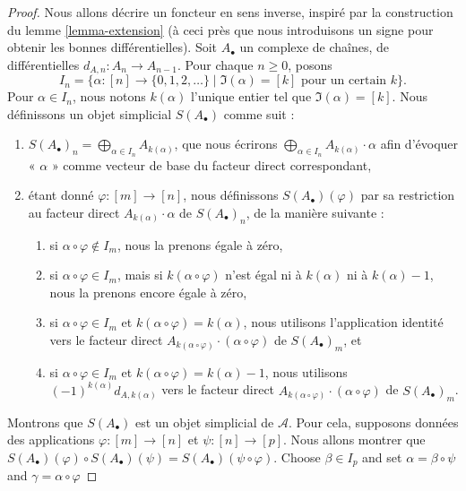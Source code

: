 \begin{proof}
Nous allons décrire un foncteur en sens inverse,
inspiré par la construction du lemme \ref{lemma-extension}
(à ceci près que nous introduisons un signe pour obtenir les bonnes
différentielles). Soit $A_\bullet$ un complexe de chaînes, de différentielles
$d_{A, n} : A_n \to A_{n - 1}$. Pour chaque $n \geq 0$, posons
$$
I_n =
\Big\{
\alpha : [n] \to \{0, 1, 2, \ldots\}
\mid
\Im(\alpha) = [k]\text{ pour un certain }k
\Big\}.
$$
Pour $\alpha \in I_n$, nous notons $k(\alpha)$ l'unique
entier tel que $\Im(\alpha) = [k]$.
Nous définissons un objet simplicial $S(A_\bullet)$ comme suit :
\begin{enumerate}
\item $S(A_\bullet)_n = \bigoplus_{\alpha \in I_n} A_{k(\alpha)}$, que
nous écrirons
$\bigoplus_{\alpha \in I_n} A_{k(\alpha)} \cdot \alpha$
afin d'évoquer « $\alpha$ » comme vecteur de base du
facteur direct correspondant,
\item étant donné $\varphi : [m] \to [n]$, nous définissons
$S(A_\bullet)(\varphi)$ par sa restriction au
facteur direct $A_{k(\alpha)} \cdot \alpha$
de $S(A_\bullet)_n$, de la manière suivante :
\begin{enumerate}
\item si $\alpha \circ \varphi \not \in I_m$, nous la prenons égale à zéro,
\item si $\alpha \circ \varphi \in I_m$, mais si $k(\alpha \circ \varphi)$
n'est égal ni à $k(\alpha)$ ni à $k(\alpha) - 1$, nous la prenons
encore égale à zéro,
\item si $\alpha \circ \varphi \in I_m$
et $k(\alpha \circ \varphi) = k(\alpha)$, nous utilisons
l'application identité vers le facteur direct
$A_{k(\alpha \circ \varphi)} \cdot (\alpha \circ \varphi)$
de $S(A_\bullet)_m$, et
\item si $\alpha \circ \varphi \in I_m$
et $k(\alpha \circ \varphi) = k(\alpha) - 1$,
nous utilisons $(-1)^{k(\alpha)} d_{A, k(\alpha)}$ vers le facteur direct
$A_{k(\alpha \circ \varphi)}\cdot (\alpha \circ \varphi)$
de $S(A_\bullet)_m$.
\end{enumerate}
\end{enumerate}
Montrons que $S(A_\bullet)$ est un objet simplicial de $\mathcal{A}$.
Pour cela, supposons données des applications $\varphi : [m] \to [n]$ et
$\psi : [n] \to [p]$. Nous allons montrer que
$S(A_\bullet)(\varphi) \circ S(A_\bullet)(\psi) =
S(A_\bullet)(\psi \circ \varphi)$. Choose $\beta \in I_p$ and set
$\alpha = \beta \circ \psi$ and $\gamma = \alpha \circ \varphi$

\end{proof}
